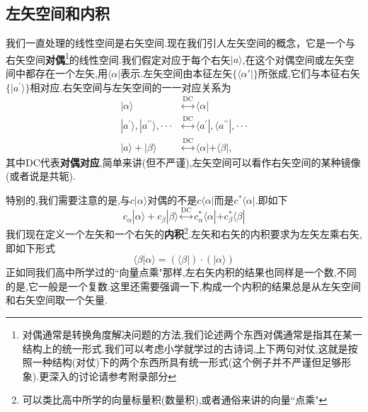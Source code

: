 \documentclass[lang=cn,newtx,10pt,scheme=chinese,thmcnt=section]{elegantbook}
\begin{document}
\subsection*{左矢空间和内积}
我们一直处理的线性空间是右矢空间.现在我们引人左矢空间的概念，它是一个与右矢空间\textbf{对偶}\footnote{对偶通常是转换角度解决问题的方法,我们论述两个东西对偶通常是指其在某一结构上的统一形式.我们可以考虑小学就学过的古诗词,上下两句对仗,这就是按照一种结构(对仗)下的两个东西所具有统一形式(这个例子并不严谨但足够形象).更深入的讨论请参考附录部分}的线性空间.我们假定对应于每个右矢$|a\rangle$,在这个对偶空间或左矢空间中都存在一个左矢,用$\langle\alpha|$表示.左矢空间由本征左矢$\{\langle\alpha'|\}$所张成,它们与本征右矢$\{|a^{\prime}\rangle\}$相对应.右矢空间与左矢空间的一一对应关系为
\begin{equation}
	\begin{aligned}|\alpha\rangle&\overset{\mathrm{DC}}{\operatorname*{\longleftrightarrow}}\langle\alpha|\\| a^{\prime}\rangle,| a^{\prime\prime}\rangle,\cdotp\cdotp\cdotp&\overset{\mathrm{DC}}{\operatorname*{\longleftrightarrow}}\langle a^{\prime}|,\langle a^{\prime\prime}|,\cdotp\cdotp\cdotp\\| a\rangle+|\beta\rangle&\overset{\mathrm{DC}}{\operatorname*{\longleftrightarrow}}\langle\alpha|+\langle\beta|,\end{aligned}
\end{equation}
其中DC代表\textbf{对偶对应},简单来讲(但不严谨),左矢空间可以看作右矢空间的某种镜像(或者说是共轭).

特别的,我们需要注意的是,与$c|\alpha\rangle$对偶的不是$c\langle\alpha|$而是$c^*\langle\alpha|$.即如下
\begin{equation}
	c_\alpha|\alpha\rangle+c_\beta|\beta\rangle\overset{\mathrm{DC}}{\operatorname*{\longleftrightarrow}}c_\alpha^*\langle\alpha|+c_\beta^*\langle\beta|
\end{equation}
我们现在定义一个左矢和一个右矢的\textbf{内积}\footnote{可以类比高中所学的向量标量积(数量积),或者通俗来讲的向量``点乘"}.左矢和右矢的内积要求为左矢左乘右矢,即如下形式
\begin{equation}
	\langle\beta|\alpha\rangle=(\langle\beta|)\cdot(|\alpha\rangle)
\end{equation}
正如同我们高中所学过的``向量点乘"那样,左右矢内积的结果也同样是一个数,不同的是,它一般是一个复数.这里还需要强调一下,构成一个内积的结果总是从左矢空间和右矢空间取一个矢量.
\end{document}
